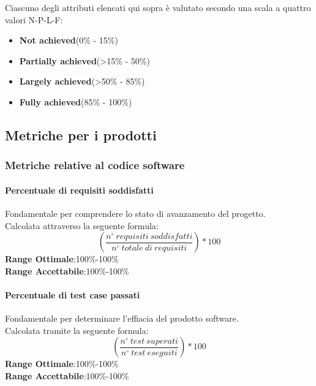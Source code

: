Ciascuno degli attributi elencati qui sopra è valutato secondo una scala a quattro valori N-P-L-F:
\begin{itemize}
	\item{\textbf{Not achieved}}(0\% - 15\%)
	\item{\textbf{Partially achieved}}(>15\% - 50\%)
	\item{\textbf{Largely achieved}}(>50\% - 85\%)
	\item{\textbf{Fully achieved}}(85\% - 100\%)
\end{itemize}
\subsection{Metriche per i prodotti}
\subsubsection{Metriche relative al codice software}
\paragraph{Percentuale di requisiti soddisfatti}
\begin{flushleft}
Fondamentale per comprendere lo stato di avanzamento del progetto.\\
Calcolata attraverso la seguente formula:
$$
	(\frac{n^{\circ}\:requisiti\:soddisfatti}{n^{\circ}\:totale\:di\:requisiti})*100
$$
\textbf{Range Ottimale}:100\%-100\% \\
\textbf{Range Accettabile}:100\%-100\%
\end{flushleft}
\paragraph{Percentuale di test case passati}
\begin{flushleft}
Fondamentale per determinare l'effiacia del prodotto software.\\
Calcolata tramite la seguente formula:
$$
	(\frac{n^{\circ}\:test\:superati}{n^{\circ}\:test\:eseguiti})*100
$$
\textbf{Range Ottimale}:100\%-100\% \\
\textbf{Range Accettabile}:100\%-100\%
\end{flushleft}
